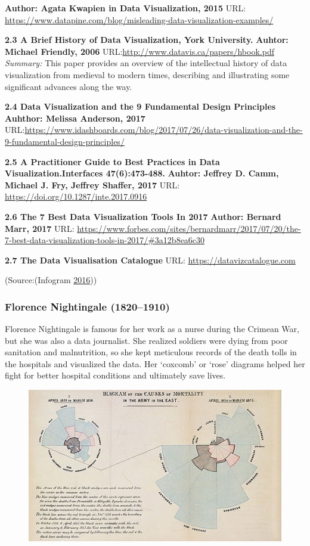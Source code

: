 \documentclass[]{book}
\theoremstyle{definition}
\theoremstyle{definition}
\theoremstyle{definition}
\theoremstyle{remark}
\begin{document}
\textbf{Author: Agata Kwapien in Data Visualization, 2015} URL:
\url{https://www.datapine.com/blog/misleading-data-visualization-examples/}

\textbf{2.3 A Brief History of Data Visualization, York University.}
\textbf{Auhtor: Michael Friendly, 2006}
URL:\url{http://www.datavis.ca/papers/hbook.pdf} \emph{Summary: } This
paper provides an overview of the intellectual history of data
visualization from medieval to modern times, describing and illustrating
some significant advances along the way.

\textbf{2.4 Data Visualization and the 9 Fundamental Design Principles}
\textbf{Auhthor: Melissa Anderson, 2017}
URL:\url{https://www.idashboards.com/blog/2017/07/26/data-visualization-and-the-9-fundamental-design-principles/}

\textbf{2.5 A Practitioner Guide to Best Practices in Data
Visualization.Interfaces 47(6):473-488.} \textbf{Auhtor: Jeffrey D.
Camm, Michael J. Fry, Jeffrey Shaffer, 2017 } URL:
\url{https://doi.org/10.1287/inte.2017.0916}

\textbf{2.6 The 7 Best Data Visualization Tools In 2017} \textbf{Author:
Bernard Marr, 2017} URL:
\url{https://www.forbes.com/sites/bernardmarr/2017/07/20/the-7-best-data-visualization-tools-in-2017/\#3a12b8ea6c30}

\textbf{2.7 The Data Visualisation Catalogue} URL:
\url{https://datavizcatalogue.com}

(Source:(Infogram \protect\hyperlink{ref-history_viz}{2016}))

\subsubsection{Florence Nightingale
(1820--1910)}\label{florence-nightingale-18201910}

Florence Nightingale is famous for her work as a nurse during the
Crimean War, but she was also a data journalist. She realized soldiers
were dying from poor sanitation and malnutrition, so she kept meticulous
records of the death tolls in the hospitals and visualized the data. Her
`coxcomb' or `rose' diagrams helped her fight for better hospital
conditions and ultimately save lives.

\begin{figure}
\centering
\includegraphics{images/FlorenceNightingale.png}
\caption{}
\end{figure}
\end{document}
